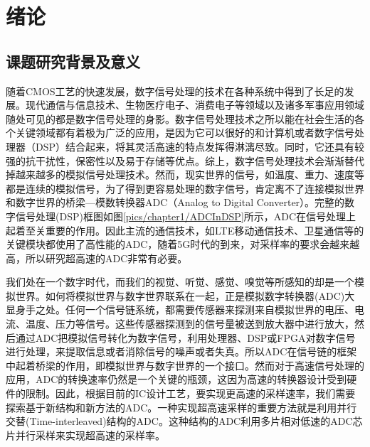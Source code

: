 


\chapter{绪论}

	
\section {课题研究背景及意义}
	随着CMOS工艺的快速发展，数字信号处理的技术在各种系统中得到了长足的发展。现代通信与信息技术、生物医疗电子、消费电子等领域以及诸多军事应用领域随处可见的都是数字信号处理的身影。数字信号处理技术之所以能在社会生活的各个关键领域都有着极为广泛的应用，是因为它可以很好的和计算机或者数字信号处理器（DSP）结合起来，将其灵活高速的特点发挥得淋漓尽致。同时，它还具有较强的抗干扰性，保密性以及易于存储等优点。综上，数字信号处理技术会渐渐替代掉越来越多的模拟信号处理技术。然而，现实世界的信号，如温度、重力、速度等都是连续的模拟信号，为了得到更容易处理的数字信号，肯定离不了连接模拟世界和数字世界的桥梁---模数转换器ADC（Analog to Digital Converter）。完整的数字信号处理(DSP)框图如图\ref{pics/chapter1/ADCInDSP}所示，ADC在信号处理上起着至关重要的作用。因此主流的通信技术，如LTE移动通信技术、卫星通信等的关键模块都使用了高性能的ADC，随着5G时代的到来，对采样率的要求会越来越高，所以研究超高速的ADC非常有必要。\par
	
	我们处在一个数字时代，而我们的视觉、听觉、感觉、嗅觉等所感知的却是一个模拟世界。如何将模拟世界与数字世界联系在一起，正是模拟数字转换器(ADC)大显身手之处。任何一个信号链系统，都需要传感器来探测来自模拟世界的电压、电流、温度、压力等信号。这些传感器探测到的信号量被送到放大器中进行放大，然后通过ADC把模拟信号转化为数字信号，利用处理器、DSP或FPGA对数字信号进行处理，来提取信息或者消除信号的噪声或者失真。所以ADC在信号链的框架中起着桥梁的作用，即模拟世界与数字世界的一个接口。然而对于高速信号处理的应用，ADC的转换速率仍然是一个关键的瓶颈，这因为高速的转换器设计受到硬件的限制。因此，根据目前的IC设计工艺，要实现更高速的采样速率，我们需要探索基于新结构和新方法的ADC。一种实现超高速采样的重要方法就是利用并行交替(Time-interleaved)结构的ADC。这种结构的ADC利用多片相对低速的ADC芯片并行采样来实现超高速的采样率。\par
	
	
